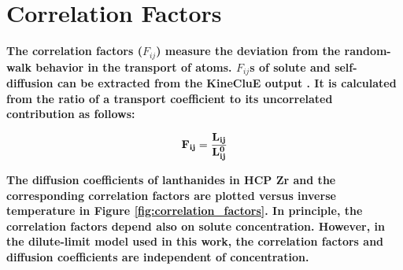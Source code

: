 \documentclass[preprint,12pt]{elsarticle}
\providecommand{\DIFadd}[1]{{\bf #1}} %
\providecommand{\DIFdelbegin}{\protect\color{red}} %
\providecommand{\DIFaddFL}[1]{\DIFadd{#1}} %
\providecommand{\DIFaddbeginFL}{} %
\providecommand{\DIFdelendFL}{} %
\newcommand{\DIFscaledelfig}{0.5}
\newlength{\DIFdelgraphicswidth} %
\newlength{\DIFdelgraphicsheight} %
\newcommand{\DIFaddincludegraphics}[2][]{{\color{blue}\fbox{\DIFOincludegraphics[#1]{#2}}}} %
\newcommand{\DIFdelincludegraphics}[2][]{%
\sbox{\DIFdelgraphicsbox}{\DIFOincludegraphics[#1]{#2}}%
\settoboxwidth{\DIFdelgraphicswidth}{\DIFdelgraphicsbox} %
\settoboxtotalheight{\DIFdelgraphicsheight}{\DIFdelgraphicsbox} %
\scalebox{\DIFscaledelfig}{%
\parbox[b]{\DIFdelgraphicswidth}{\usebox{\DIFdelgraphicsbox}\\[-\baselineskip] \rule{\DIFdelgraphicswidth}{0em}}\llap{\resizebox{\DIFdelgraphicswidth}{\DIFdelgraphicsheight}{%
\setlength{\unitlength}{\DIFdelgraphicswidth}%
\begin{picture}(1,1)%
\thicklines\linethickness{2pt} %
{\color[rgb]{1,0,0}\put(0,0){\framebox(1,1){}}}%
{\color[rgb]{1,0,0}\put(0,0){\line( 1,1){1}}}%
{\color[rgb]{1,0,0}\put(0,1){\line(1,-1){1}}}%
\end{picture}%
}\hspace*{3pt}}} %
} %
\DeclareRobustCommand{\DIFdelbegin}{\DIFOdelbegin \let\includegraphics\DIFdelincludegraphics} %
\DeclareRobustCommand{\DIFaddbeginFL}{\DIFOaddbeginFL \let\includegraphics\DIFaddincludegraphics} %
\DeclareRobustCommand{\DIFdelendFL}{\DIFOaddendFL \let\includegraphics\DIFOincludegraphics} %
\begin{document}
\FloatBarrier

\DIFdelbegin %
\DIFdelendFL \DIFaddbeginFL \section{\DIFaddFL{Correlation Factors}}
\label{appendix_correlation}

\setcounter{figure}{0}
\setcounter{table}{0}

\DIFaddFL{The correlation factors ($F_{ij}$) measure the deviation from the random-walk behavior in the transport of atoms. $F_{ij}$s of solute and self-diffusion can be extracted from the KineCluE output \cite{schuler_kineclue_2020}. It is calculated from the ratio of a transport coefficient to its uncorrelated contribution \cite{schuler_kineclue_2020} as follows:
}

\begin{equation}
    \DIFaddFL{F_{ij} = \frac{L_{ij}}{L_{ij}^0}
}\end{equation}

\DIFaddFL{The diffusion coefficients of lanthanides in HCP Zr 
and the corresponding correlation factors are plotted versus inverse temperature in Figure \ref{fig:correlation_factors}. In principle, the correlation factors depend also on solute concentration. However, in the dilute-limit model used in this work, the correlation factors and diffusion coefficients are independent of concentration.
}
\end{document}
